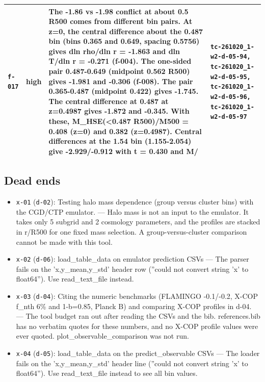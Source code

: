\documentclass[11pt,a4paper]{article}
\begin{document}
\begin{longtable}{@{}p{}p{}p{}p{}@{}}
\texttt{f-017} & high & The -1.86 vs -1.98 conflict at about 0.5 R500 comes from different bin pairs. At z=0, the central difference about the 0.487 bin (bins 0.365 and 0.649, spacing 0.5756) gives dln rho/dln r = -1.863 and dln T/dln r = -0.271 (f-004). The one-sided pair 0.487-0.649 (midpoint 0.562 R500) gives -1.981 and -0.306 (f-008). The pair 0.365-0.487 (midpoint 0.422) gives -1.745. The central difference at 0.487 at z=0.4987 gives -1.872 and -0.345. With these, M\_HSE(\textless{}0.487 R500)/M500 = 0.408 (z=0) and 0.382 (z=0.4987). Central differences at the 1.54 bin (1.155-2.054) give -2.929/-0.912 with t = 0.430 and M/ & \texttt{tc-261020\_\allowbreak{}1-w2-d-05-94,\allowbreak{} tc-261020\_\allowbreak{}1-w2-d-05-95,\allowbreak{} tc-261020\_\allowbreak{}1-w2-d-05-96,\allowbreak{} tc-261020\_\allowbreak{}1-w2-d-05-97} \\
\bottomrule\end{longtable}
\subsection{Dead ends}
\begin{itemize}
  \item \texttt{x-01} (\texttt{d-02}): Testing halo mass dependence (group versus cluster bins) with the CGD/CTP emulator. --- Halo mass is not an input to the emulator. It takes only 5 subgrid and 2 cosmology parameters, and the profiles are stacked in r/R500 for one fixed mass selection. A group-versus-cluster comparison cannot be made with this tool.
  \item \texttt{x-02} (\texttt{d-06}): load\_table\_data on emulator prediction CSVs --- The parser fails on the 'x,y\_mean,y\_std' header row (''could not convert string 'x' to float64''). Use read\_text\_file instead.
  \item \texttt{x-03} (\texttt{d-04}): Citing the numeric benchmarks (FLAMINGO -0.1/-0.2, X-COP f\_nth 6\% and 1-b=0.85, Planck B) and comparing X-COP profiles in d-04. --- The tool budget ran out after reading the CSVs and the bib. references.bib has no verbatim quotes for these numbers, and no X-COP profile values were ever quoted. plot\_observable\_comparison was not run.
  \item \texttt{x-04} (\texttt{d-05}): load\_table\_data on the predict\_observable CSVs --- The loader fails on the 'x,y\_mean,y\_std' header line (''could not convert string 'x' to float64''). Use read\_text\_file instead to see all bin values.
\end{itemize}
\end{document}
